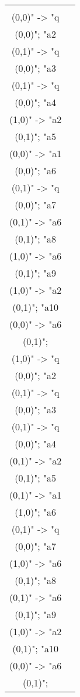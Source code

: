 \documentclass[12pt]{article}
\theoremstyle{defi}
\theoremstyle{not}
\theoremstyle{prob}
\begin{document}
\begin{figure}
\begin{tabular}{cc}
        \begin{tikzpicture}[>=stealth]
        \graph [ layered layout, nodes = {scale=0.75, align=center} ] {
        "a1\\ (0,0)" -> "q\\ (0,0)";
        "a2\\ (0,1)" -> "q\\ (0,0)";
        "a3\\ (0,1)" -> "q\\ (0,0)";
        "a4\\ (1,0)" -> "a2\\ (0,1)";
        "a5\\ (0,0)" -> "a1\\ (0,0)";
        "a6\\ (0,1)" -> "q\\ (0,0)";
        "a7\\ (0,1)" -> "a6\\ (0,1)";
        "a8\\ (1,0)" -> "a6\\ (0,1)";
        "a9\\ (1,0)" -> "a2\\ (0,1)";
        "a10\\ (0,0)" -> "a6\\ (0,1)";
        };
        \end{tikzpicture} &

        \begin{tikzpicture}[>=stealth]
        \graph [ layered layout, nodes = {scale=0.75, align=center} ] {
        "a1\\ (1,0)" -> "q\\ (0,0)";
        "a2\\ (0,1)" -> "q\\ (0,0)";
        "a3\\ (0,1)" -> "q\\ (0,0)";
        "a4\\ (0,1)" -> "a2\\ (0,1)";
        "a5\\ (0,1)" -> "a1\\ (1,0)";
        "a6\\ (0,1)" -> "q\\ (0,0)";
        "a7\\ (1,0)" -> "a6\\ (0,1)";
        "a8\\ (0,1)" -> "a6\\ (0,1)";
        "a9\\ (1,0)" -> "a2\\ (0,1)";
        "a10\\ (0,0)" -> "a6\\ (0,1)";
        };
        \end{tikzpicture} \\


\end{tabular}
\end{figure}
\end{document}
